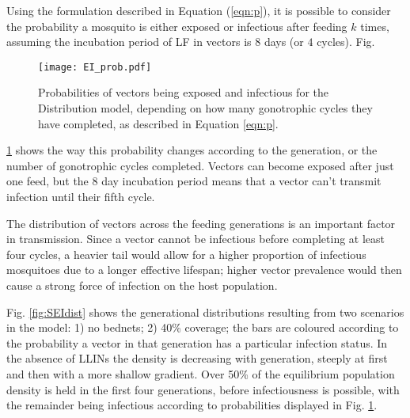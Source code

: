 \documentclass[5p,times]{elsarticle}
\begin{document}
Using the formulation described in Equation (\ref{eqn:p}), it is possible to consider the probability a mosquito is either exposed or infectious after feeding $k$ times, assuming the incubation period of LF in vectors is $8$ days (or $4$ cycles). Fig. \begin{figure}[h]
\begin{center}
\texttt{[image: EI\_prob.pdf]}
\caption{Probabilities of vectors being exposed and infectious for the Distribution model, depending on how many gonotrophic cycles they have completed, as described in Equation \ref{eqn:p}.}
\label{fig:EIprob}
\end{center}
\end{figure} \ref{fig:EIprob} shows the way this probability changes according to the generation, or the number of gonotrophic cycles completed. Vectors can become exposed after just one feed, but the 8 day incubation period means that a vector can't transmit infection until their fifth cycle.

The distribution of vectors across the feeding generations is an important factor in transmission. Since a vector cannot be infectious before completing at least four cycles, a heavier tail would allow for a higher proportion of infectious mosquitoes due to a longer effective lifespan; higher vector prevalence would then cause a strong force of infection on the host population. 

Fig. \ref{fig:SEIdist} shows the generational distributions resulting from two scenarios in the model: 1) no bednets; 2) 40\% coverage; the bars are coloured according to the probability a vector in that generation has a particular infection status. In the absence of LLINs the density is decreasing with generation, steeply at first and then with a more shallow gradient. Over 50\% of the equilibrium population density is held in the first four generations, before infectiousness is possible, with the remainder being infectious according to probabilities displayed in Fig. \ref{fig:EIprob}. 
\end{document}
